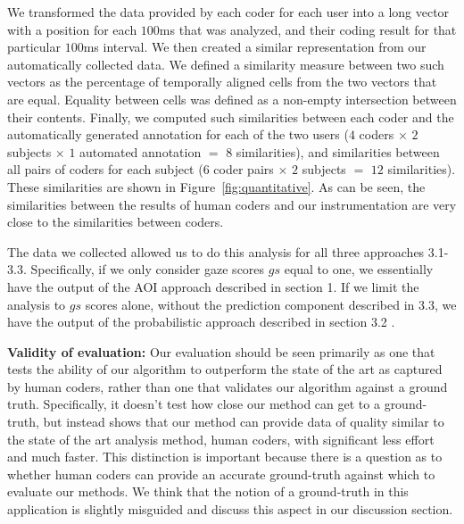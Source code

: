 We transformed the data provided by each coder for each user into a long vector with a position for each $100$ms that was analyzed, and their coding result for that particular $100$ms interval. We then created a similar representation from our automatically collected data. We defined a similarity measure between two such vectors as the percentage of temporally aligned cells from the two vectors that are equal. Equality between cells was defined as a non-empty intersection between their contents. Finally, we computed such similarities between each coder and the automatically generated annotation for each of the two users ($4$ coders $\times$ $2$ subjects $\times$ $1$ automated annotation $=$ $8$ similarities), and similarities between all pairs of coders for each subject ($6$ coder pairs $\times$ $2$ subjects $=$ $12$ similarities). These similarities are shown in Figure~\ref{fig:quantitative}. As can be seen, the similarities between the results of human coders and our instrumentation are very close to the similarities between coders. 

The data we collected allowed us to do this analysis for all three approaches 3.1-3.3. Specifically, if we only consider gaze scores $gs$ equal to one, we essentially have the output of the AOI approach described in section 1. If we limit the analysis to $gs$ scores alone, without the prediction component described in 3.3, we have the output of the probabilistic approach described in section 3.2 .

\textbf{Validity of evaluation:} Our evaluation should be seen primarily as one that tests the ability of our algorithm to outperform the state of the art as captured by human coders, rather than one that validates our algorithm against a ground truth. Specifically, it doesn't test how close our method can get to a ground-truth, but instead shows that our method can provide data of quality similar to the state of the art analysis method, human coders, with significant less effort and much faster. This distinction is important because there is a question as to whether human coders can provide an accurate ground-truth against which to evaluate our methods. We think that the notion of a ground-truth in this application is slightly misguided and discuss this aspect in our discussion section. 

